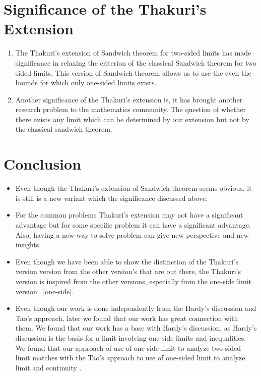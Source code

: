 \documentclass[a4paper,twoside,12pt]{article}
\theoremstyle{plain}
\theoremstyle{definition}
\theoremstyle{theorem}
\begin{document}
{\section{Significance of the Thakuri's Extension}
\begin{enumerate}
\item The Thakuri's extension of Sandwich theorem for two-sided limits has made significance in relaxing the criterion of the classical Sandwich theorem for two sided limits. This version of Sandwich theorem allows us to use the even the bounds for which only one-sided limits exists.

\item Another significance of the Thakuri's extension is, it has brought another research problem to the mathematics community. The question of whether there exists any limit which can be determined by our extension but not by the classical sandwich theorem.

\end{enumerate}

\section{Conclusion}
\begin{itemize}
\item Even though the Thakuri's extension of Sandwich theorem seems obvious, it is still is a new variant which the significance discussed above.

\item For the common problems Thakuri's extension may not have a significant advantage but for some specific problem it can have a significant advantage. Also, having a new way to solve problem can give new perspective and new insights.

\item Even though we have been able to show the distinction of the Thakuri's version version from the other version's that are out there, the Thakuri's version is inspired from the other versions, especially from the one-side limit version ~\ref{one-side}.

\item Even though our work is done independently from the Hardy's discussion and Tao's approach, later we found that our work has great connection with them. We found that our work has a base with Hardy's discussion, as Hardy's discussion is the basis for a limit involving one-side limits and inequalities. We found that our approach of use of one-side limit to analyze two-sided limit matches with the Tao's approach to use of one-sided limit to analyze limit and continuity \cite{tao}.
\end{itemize}

}
\end{document}
